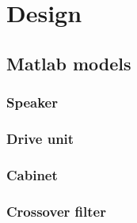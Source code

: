 
\chapter{Design}
\label{ch:Design}


\section{Matlab models}
\subsection{Speaker}

\subsection{Drive unit}
\cite[p.~49]{Elektroakustik}
\subsection{Cabinet}

\subsection{Crossover filter}

\FloatBarrier